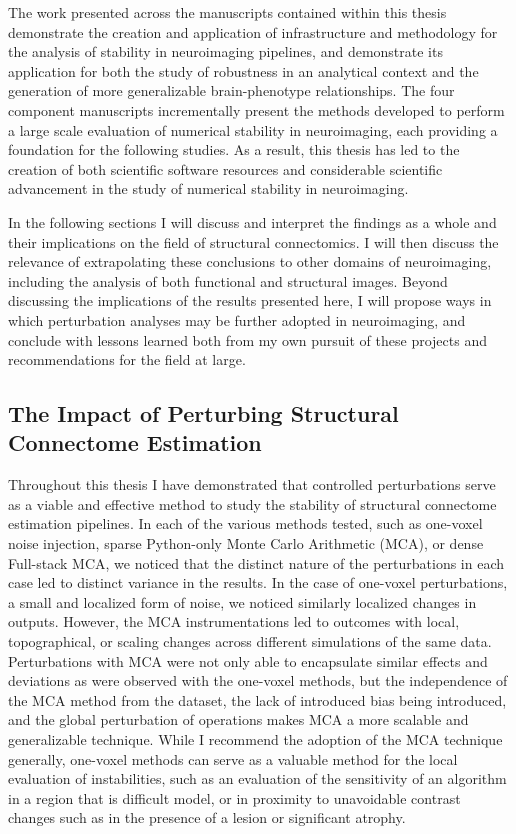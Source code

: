 The work presented across the manuscripts contained within this thesis demonstrate the creation and application of
infrastructure and methodology for the analysis of stability in neuroimaging pipelines, and demonstrate its
application for both the study of robustness in an analytical context and the generation of more generalizable
brain-phenotype relationships. The four component manuscripts incrementally present the methods developed to
perform a large scale evaluation of numerical stability in neuroimaging, each providing a foundation for the
following studies. As a result, this thesis has led to the creation of both scientific software resources and
considerable scientific advancement in the study of numerical stability in neuroimaging.

In the following sections I will discuss and interpret the findings as a whole and their implications on the field
of structural connectomics. I will then discuss the relevance of extrapolating these conclusions to other domains
of neuroimaging, including the analysis of both functional and structural images. Beyond discussing the
implications of the results presented here, I will propose ways in which perturbation analyses may be further
adopted in neuroimaging, and conclude with lessons learned both from my own pursuit of these projects and
recommendations for the field at large.

\subsection{The Impact of Perturbing Structural Connectome Estimation}

Throughout this thesis I have demonstrated that controlled perturbations serve as a viable and effective method
to study the stability of structural connectome estimation pipelines. In each of the various methods tested, such
as one-voxel noise injection, sparse Python-only Monte Carlo Arithmetic (MCA), or dense Full-stack MCA, we noticed
that the distinct nature of the perturbations in each case led to distinct variance in the results. In the case of
one-voxel perturbations, a small and localized form of noise, we noticed similarly localized changes in outputs.
However, the MCA instrumentations led to outcomes with local, topographical, or scaling changes across different
simulations of the same data. Perturbations with MCA were not only able to encapsulate similar effects and
deviations as were observed with the one-voxel methods, but the independence of the MCA method from the dataset,
the lack of introduced bias being introduced, and the global perturbation of operations makes MCA a more
scalable and generalizable technique. While I recommend the adoption of the MCA technique generally, one-voxel
methods can serve as a valuable method for the local evaluation of instabilities, such as an evaluation of the
sensitivity of an algorithm in a region that is difficult model, or in proximity to unavoidable contrast changes
such as in the presence of a lesion or significant atrophy.

